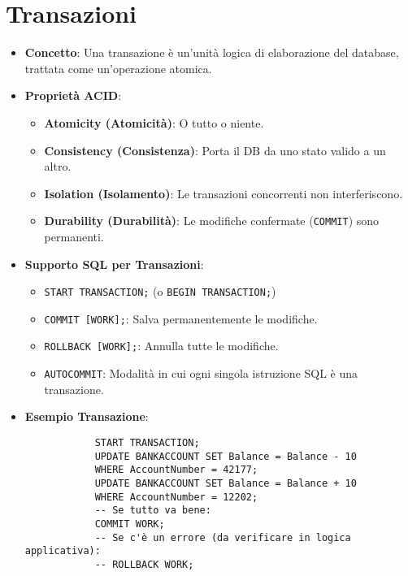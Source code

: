 \documentclass{article}
\begin{document}
	\section{Transazioni}
	\begin{itemize}
		\item \textbf{Concetto}: Una transazione è un'unità logica di elaborazione del database, trattata come un'operazione atomica.
		\item \textbf{Proprietà ACID}:
		\begin{itemize}
			\item \textbf{Atomicity (Atomicità)}: O tutto o niente.
			\item \textbf{Consistency (Consistenza)}: Porta il DB da uno stato valido a un altro.
			\item \textbf{Isolation (Isolamento)}: Le transazioni concorrenti non interferiscono.
			\item \textbf{Durability (Durabilità)}: Le modifiche confermate (\texttt{COMMIT}) sono permanenti.
		\end{itemize}
		\item \textbf{Supporto SQL per Transazioni}:
		\begin{itemize}
			\item \texttt{START TRANSACTION;} (o \texttt{BEGIN TRANSACTION;})
			\item \texttt{COMMIT [WORK];}: Salva permanentemente le modifiche.
			\item \texttt{ROLLBACK [WORK];}: Annulla tutte le modifiche.
			\item \texttt{AUTOCOMMIT}: Modalità in cui ogni singola istruzione SQL è una transazione.
		\end{itemize}
		\item \textbf{Esempio Transazione}:
		\begin{verbatim}
			START TRANSACTION;
			UPDATE BANKACCOUNT SET Balance = Balance - 10
			WHERE AccountNumber = 42177;
			UPDATE BANKACCOUNT SET Balance = Balance + 10
			WHERE AccountNumber = 12202;
			-- Se tutto va bene:
			COMMIT WORK;
			-- Se c'è un errore (da verificare in logica applicativa):
			-- ROLLBACK WORK;
		\end{verbatim}
	\end{itemize}
	
\end{document}
